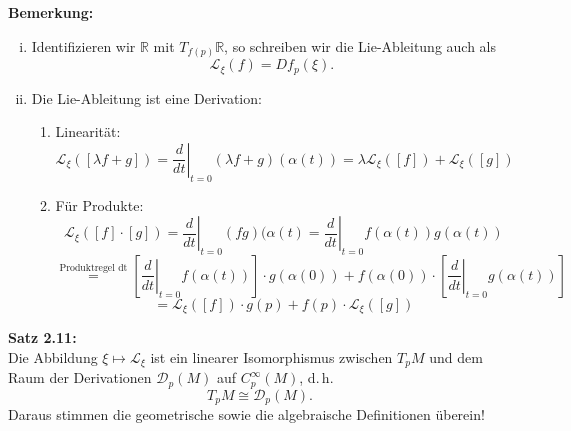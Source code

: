 \documentclass[fleqn, 12pt, letterpaper]{article}
\newcommand{\txt}[1]{\text{#1}}
\begin{document}
\textbf{Bemerkung:}
\begin{enumerate}[i)]
    \item Identifizieren wir \(\mathbb{R}\) mit \(T_{f(p)} \mathbb{R}\), so schreiben wir die Lie-Ableitung auch als
    \[
    \mathcal{L}_\xi(f) = Df_p(\xi).
    \]
    
    \item Die Lie-Ableitung ist eine Derivation:
    \begin{enumerate}
        \item Linearität:
    \[
    \mathcal{L}_{\xi}([\lambda f+g]) = \left. \frac{d}{dt} \right|_{t=0} (\lambda f+g )(\alpha(t))  = \lambda \mathcal{L}_{\xi}([f]) + \mathcal{L}_{\xi}([g])
    \]
        
        \item Für Produkte:
\[
    \mathcal{L}_{\xi}([f] \cdot [g]) = \left. \frac{d}{dt} \right|_{t=0} (fg)(\alpha(t) = \left. \frac{d}{dt} \right|_{t=0} f(\alpha(t))g(\alpha(t))
    \]
\[
    \overset{\txt{Produktregel dt}}{=}[\left. \frac{d}{dt} \right|_{t=0}f(\alpha(t))] \cdot g(\alpha(0)) + f(\alpha(0)) \cdot [\left. \frac{d}{dt} \right|_{t=0} g(\alpha(t))]
    \]
    \[
    = \mathcal{L}_{\xi}([f]) \cdot g(p) + f(p) \cdot \mathcal{L}_{\xi}([g])
    \]
   \end{enumerate}
\end{enumerate}

\textbf{Satz 2.11:} \\
Die Abbildung \(\xi \mapsto \mathcal{L}_\xi\) ist ein linearer Isomorphismus zwischen \(T_p M\) und dem Raum der Derivationen $\mathcal{D}_p(M)$ auf \(C_p^\infty(M)\), d.\,h.
\[
T_p M \cong \mathcal{D}_p(M).
\]
Daraus stimmen die geometrische sowie die algebraische Definitionen überein!
\vspace{1em}
\end{document}
